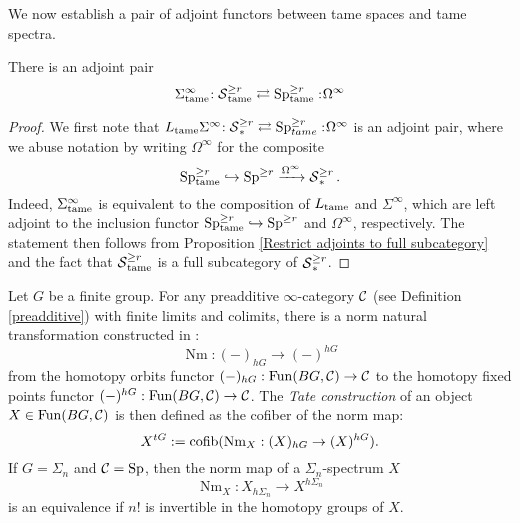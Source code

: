 We now establish a pair of adjoint functors between tame spaces and tame spectra.

\begin{proposition}
	There is an adjoint pair
	\[
	\Sigma^{\infty}_{\operatorname{\operatorname{tame}}}\negmedspace: \operatorname{\mathcal{S}}^{\geq r}_{\operatorname{\operatorname{tame}}}\rightleftarrows \operatorname{Sp}^{\geq r}_{\operatorname{\operatorname{tame}}}:\negmedspace \Omega^{\infty}
	\]
\end{proposition}
\begin{proof}
	We first note that $L_{\operatorname{\operatorname{tame}}}\Sigma^{\infty}\negmedspace: \operatorname{\mathcal{S}}_{*}^{\geq r}\rightleftarrows \operatorname{Sp}^{\geq r}_{tame}:\negmedspace \Omega^\infty$ is an adjoint pair, where we abuse notation by writing $\Omega^{\infty}$ for the composite  $$
	\operatorname{Sp}^{\geq r}_{\operatorname{\operatorname{tame}}}\hookrightarrow \operatorname{Sp}^{\geq r} \xrightarrow{\Omega^\infty} \operatorname{\mathcal{S}}^{\geq r}_{*}.
	$$ 
	Indeed, $\Sigma^{\infty}_{\operatorname{\operatorname{tame}}}$ is equivalent to the composition of $L_{\operatorname{\operatorname{tame}}}$ and $\Sigma^\infty$, which are left adjoint to the inclusion functor $\operatorname{Sp}^{\geq r}_{\operatorname{\operatorname{tame}}}\hookrightarrow \operatorname{Sp}^{\geq r}$ and $\Omega^\infty$, respectively. The statement then follows from Proposition \ref{Restrict adjoints to full subcategory} and the fact that $\operatorname{\mathcal{S}}_{\operatorname{\operatorname{tame}}}^{\geq r}$ is a full subcategory of $\operatorname{\mathcal{S}}_{*}^{\geq r}$. 
	
\end{proof}

Let $G$ be a finite group.
For any preadditive $\infty$-category ${\mathcal{C}}$ (see Definition \ref{preadditive}) with finite limits and colimits, there is a norm natural transformation constructed in \cite[Definition I.1.10]{Nikolaus-Scholze}:
$$
\operatorname{Nm}: (-)_{hG} \to (-)^{hG}
$$
from the homotopy orbits functor $(-)_{hG}:\operatorname{Fun}(BG,{\mathcal{C}})\to {\mathcal{C}}$ to the homotopy fixed points functor $(-)^{hG}:\operatorname{Fun}(BG,{\mathcal{C}})\to {\mathcal{C}}$.
The \emph{Tate construction} of an object $X\in \operatorname{Fun}(BG,{\mathcal{C}})$ is then defined as the cofiber of the norm map:
$$
X^{tG} := \operatorname{cofib}(\operatorname{Nm}_X:(X)_{hG} \to (X)^{hG}).
$$
If $G=\Sigma_n$ and ${\mathcal{C}}=\operatorname{Sp}$, then the norm map of a $\Sigma_n$-spectrum $X$
$$
\operatorname{Nm}_X: X_{h\Sigma_n} \to X^{h\Sigma_n}
$$
is an equivalence if $n!$ is invertible in the homotopy groups of $X$.

